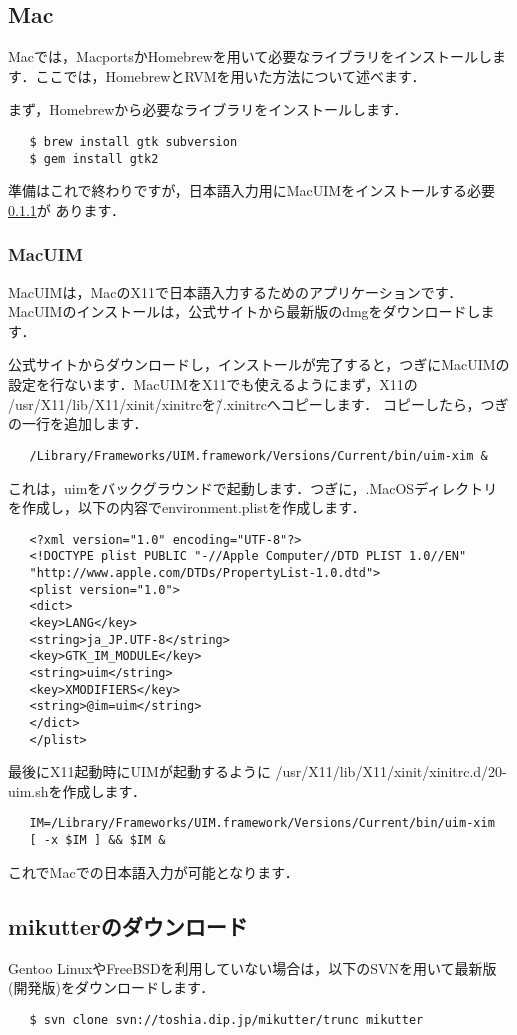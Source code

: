 \documentclass{jsarticle}
\begin{document}
  \subsection{Mac} \label{mac}
  Macでは，MacportsかHomebrewを用いて必要なライブラリをインストールしま
  す．ここでは，HomebrewとRVMを用いた方法について述べます．

  まず，Homebrewから必要なライブラリをインストールします．
  \begin{lstlisting}
   $ brew install gtk subversion
   $ gem install gtk2
  \end{lstlisting}
  準備はこれで終わりですが，日本語入力用にMacUIMをインストールする必要\ref{uim}が
  あります．

  \subsubsection{MacUIM} \label{uim}
  MacUIM\cite{macuim}は，MacのX11で日本語入力するためのアプリケーションです．
  MacUIMのインストールは，公式サイトから最新版のdmgをダウンロードします．

  公式サイトからダウンロードし，インストールが完了すると，つぎにMacUIMの
  設定を行ないます．MacUIMをX11でも使えるよう\cite{rubyneco}にまず，X11の
  /usr/X11/lib/X11/xinit/xinitrcを\~/.xinitrcへコピーします．
  コピーしたら，つぎの一行を追加します．
  \begin{lstlisting}
   /Library/Frameworks/UIM.framework/Versions/Current/bin/uim-xim &
  \end{lstlisting}
  これは，uimをバックグラウンドで起動します．つぎに，.MacOSディレクトリ
  を作成し，以下の内容でenvironment.plistを作成します．
  \begin{lstlisting}
   <?xml version="1.0" encoding="UTF-8"?>
   <!DOCTYPE plist PUBLIC "-//Apple Computer//DTD PLIST 1.0//EN"
   "http://www.apple.com/DTDs/PropertyList-1.0.dtd">
   <plist version="1.0">
   <dict>
   <key>LANG</key>
   <string>ja_JP.UTF-8</string>
   <key>GTK_IM_MODULE</key>
   <string>uim</string>
   <key>XMODIFIERS</key>
   <string>@im=uim</string>
   </dict>
   </plist>
  \end{lstlisting}
  最後にX11起動時にUIMが起動するように
  /usr/X11/lib/X11/xinit/xinitrc.d/20-uim.shを作成します．
  \begin{lstlisting}
   IM=/Library/Frameworks/UIM.framework/Versions/Current/bin/uim-xim
   [ -x $IM ] && $IM &
  \end{lstlisting}
  これでMacでの日本語入力が可能となります．
  
  \subsection{mikutterのダウンロード} \label{download}
  Gentoo LinuxやFreeBSDを利用していない場合は，以下のSVNを用いて最新版
  (開発版)をダウンロードします．
  \begin{lstlisting}
   $ svn clone svn://toshia.dip.jp/mikutter/trunc mikutter
  \end{lstlisting}
\end{document}

